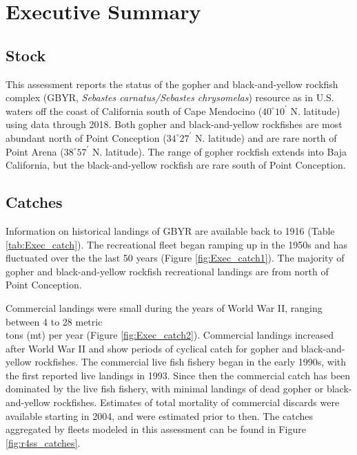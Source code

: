 \documentclass[12pt,]{article}
\begin{document}
{
\setcounter{tocdepth}{4}
\tableofcontents
}
\setlength{\parskip}{5mm plus1mm minus1mm} \pagebreak

\setcounter{page}{1} \renewcommand{\thefigure}{\alph{figure}}
\renewcommand{\thetable}{\alph{table}}

\section*{Executive Summary}\label{executive-summary}

\subsection*{Stock}\label{stock}

This assessment reports the status of the gopher and black-and-yellow
rockfish\\
complex (GBYR, \emph{Sebastes carnatus/Sebastes chrysomelas}) resource
as in U.S. waters off the coast of California south of Cape Mendocino
(\(40^\circ 10^\prime\) N. latitude) using data through 2018. Both
gopher and black-and-yellow rockfishes are most abundant north of Point
Conception (\(34^\circ 27^\prime\) N. latitude) and are rare north of
Point Arena (\(38^\circ 57^\prime\) N. latitude). The range of gopher
rockfish extends into Baja California, but the black-and-yellow rockfish
are rare south of Point Conception.

\subsection*{Catches}\label{catches}

Information on historical landings of GBYR are available back to 1916
(Table \ref{tab:Exec_catch}). The recreational fleet began ramping up in
the 1950s and has fluctuated over the the last 50 years (Figure
\ref{fig:Exec_catch1}). The majority of gopher and black-and-yellow
rockfish recreational landings are from north of Point Conception.

Commercial landings were small during the years of World War II, ranging
between 4 to 28 metric\\
tons (mt) per year (Figure \ref{fig:Exec_catch2}). Commercial landings
increased after World War II and show periods of cyclical catch for
gopher and black-and-yellow rockfishes. The commercial live fish fishery
began in the early 1990s, with the first reported live landings in 1993.
Since then the commercial catch has been dominated by the live fish
fishery, with minimal landings of dead gopher or black-and-yellow
rockfishes. Estimates of total mortality of commercial discards were
available starting in 2004, and were estimated prior to then. The
catches aggregated by fleets modeled in this assessment can be found in
Figure \ref{fig:r4ss_catches}.
\end{document}
